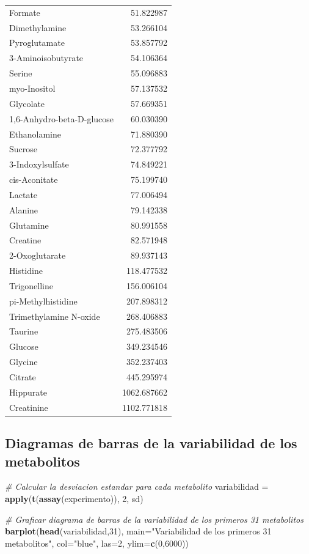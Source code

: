 \documentclass[
]{article}
\newenvironment{Shaded}{\begin{snugshade}}{\end{snugshade}}
\newcommand{\AttributeTok}[1]{\textcolor[rgb]{0.13,0.29,0.53}{#1}}
\newcommand{\CommentTok}[1]{\textcolor[rgb]{0.56,0.35,0.01}{\textit{#1}}}
\newcommand{\DecValTok}[1]{\textcolor[rgb]{0.00,0.00,0.81}{#1}}
\newcommand{\FunctionTok}[1]{\textcolor[rgb]{0.13,0.29,0.53}{\textbf{#1}}}
\newcommand{\NormalTok}[1]{#1}
\newcommand{\OtherTok}[1]{\textcolor[rgb]{0.56,0.35,0.01}{#1}}
\newcommand{\StringTok}[1]{\textcolor[rgb]{0.31,0.60,0.02}{#1}}
\begin{document}
\begin{longtable}[]{@{}lr@{}}
Formate & 51.822987 \\
Dimethylamine & 53.266104 \\
Pyroglutamate & 53.857792 \\
3-Aminoisobutyrate & 54.106364 \\
Serine & 55.096883 \\
myo-Inositol & 57.137532 \\
Glycolate & 57.669351 \\
1,6-Anhydro-beta-D-glucose & 60.030390 \\
Ethanolamine & 71.880390 \\
Sucrose & 72.377792 \\
3-Indoxylsulfate & 74.849221 \\
cis-Aconitate & 75.199740 \\
Lactate & 77.006494 \\
Alanine & 79.142338 \\
Glutamine & 80.991558 \\
Creatine & 82.571948 \\
2-Oxoglutarate & 89.937143 \\
Histidine & 118.477532 \\
Trigonelline & 156.006104 \\
pi-Methylhistidine & 207.898312 \\
Trimethylamine N-oxide & 268.406883 \\
Taurine & 275.483506 \\
Glucose & 349.234546 \\
Glycine & 352.237403 \\
Citrate & 445.295974 \\
Hippurate & 1062.687662 \\
Creatinine & 1102.771818 \\
\end{longtable}

\subsection{Diagramas de barras de la variabilidad de los
metabolitos}\label{diagramas-de-barras-de-la-variabilidad-de-los-metabolitos}

\begin{Shaded}
\begin{Highlighting}[]
\CommentTok{\# Calcular la desviacion estandar para cada metabolito}
\NormalTok{variabilidad }\OtherTok{=} \FunctionTok{apply}\NormalTok{(}\FunctionTok{t}\NormalTok{(}\FunctionTok{assay}\NormalTok{(experimento)), }\DecValTok{2}\NormalTok{, sd)}

\CommentTok{\# Graficar diagrama de barras de la variabilidad de los primeros 31 metabolitos}
\FunctionTok{barplot}\NormalTok{(}\FunctionTok{head}\NormalTok{(variabilidad,}\DecValTok{31}\NormalTok{), }\AttributeTok{main=}\StringTok{"Variabilidad de los primeros 31 metabolitos"}\NormalTok{, }\AttributeTok{col=}\StringTok{"blue"}\NormalTok{, }\AttributeTok{las=}\DecValTok{2}\NormalTok{, }\AttributeTok{ylim=}\FunctionTok{c}\NormalTok{(}\DecValTok{0}\NormalTok{,}\DecValTok{6000}\NormalTok{))}
\end{Highlighting}
\end{Shaded}
\end{document}
